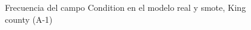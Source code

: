 \begin{figure}[H]
    \centering
    
    \caption{Frecuencia del campo Condition en el modelo real y smote, King county (A-1)}
    \label{frecuency-smote-condition}
\end{figure}